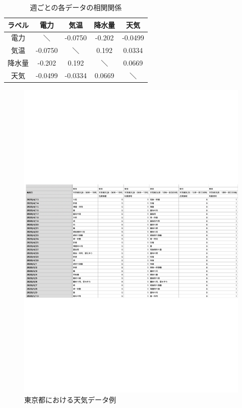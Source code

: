 \begin{table}[!t]
\centering
  \caption{週ごとの各データの相関関係}
  \begin{tabular}{|c|c|c|c|c|} \hline
    ラベル & 電力 & 気温 & 降水量 & 天気 \\ \hline
    電力 & ＼ & -0.0750 & -0.202 & -0.0499 \\ \hline
    気温 & -0.0750 & ＼ & 0.192 & 0.0334 \\ \hline
    降水量 & -0.202 & 0.192 & ＼ & 0.0669 \\ \hline
    天気 & -0.0499 & -0.0334 & 0.0669 & ＼ \\ \hline
  \end{tabular}
\end{table}
\begin{figure}[phb]
\centering
\includegraphics[scale=0.8]{exe_wether.pdf}
\caption{東京都における天気データ例}
\end{figure}

